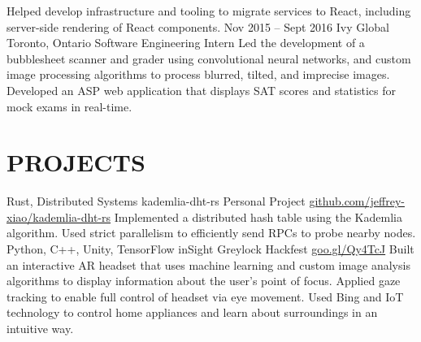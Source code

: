 \documentclass{resume}
\begin{document}
\begin{main}
\begin{entrylist}
{            {%
              Helped develop infrastructure and tooling to migrate services to React, including %
              server-side rendering of React components. %
            }%
          }
        \rightentry%
          {Nov 2015 -- Sept 2016}%
          {Ivy Global}%
          {Toronto, Ontario}%
          {Software Engineering Intern}%
          {\createlist%
            {%
              Led the development of a bubblesheet scanner and grader using convolutional neural %
              networks, and custom image processing algorithms to process blurred, tilted, and %
              imprecise images. %
            }%
            {%
              Developed an ASP web application that displays SAT scores and statistics for mock %
              exams in real-time. %
            }%
          }
      \end{entrylist}
    \section{PROJECTS}
      \begin{entrylist}
        \rightentry%
          {Rust, Distributed Systems}%
          {kademlia-dht-rs}%
          {Personal Project}%
          {\href{https://github.com/jeffrey-xiao/kademlia-dht-rs}{github.com/jeffrey-xiao/kademlia-dht-rs}}%
          {\createlist%
            {%
              Implemented a distributed hash table using the Kademlia algorithm. %
            }%
            {%
              Used strict parallelism to efficiently send RPCs to probe nearby nodes. %
            }%
          }
        \rightentry%
          {Python, C++, Unity, TensorFlow}%
          {inSight}%
          {Greylock Hackfest}%
          {\href{https://goo.gl/Qy4TcJ}{goo.gl/Qy4TcJ}}%
          {\createlist%
            {%
              Built an interactive AR headset that uses machine learning and custom image %
              analysis algorithms to display information about the user's point of focus. %
            }%
            {%
              Applied gaze tracking to enable full control of headset via eye movement. %
            }%
            {%
              Used Bing and IoT technology to control home appliances and learn about surroundings %
              in an intuitive way. %
            }%
          }
      \end{entrylist}
  \end{main}
\end{document}
